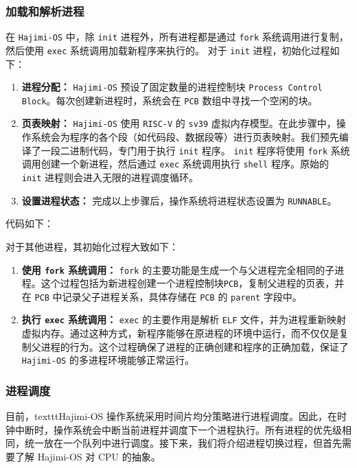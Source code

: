 \documentclass[UTF8]{article}
\begin{document}
\subsubsection{加载和解析进程}
在 \texttt{Hajimi-OS} 中，除 \texttt{init} 进程外，所有进程都是通过 \texttt{fork} 系统调用进行复制，然后使用 \texttt{exec} 系统调用加载新程序来执行的。
对于 \texttt{init} 进程，初始化过程如下：
\begin{enumerate}[label=\textbf{\arabic*}., wide, labelwidth=!, labelindent=0pt]
  \item \textbf{进程分配：} \texttt{Hajimi-OS} 预设了固定数量的进程控制块 \texttt{Process Control Block}。每次创建新进程时，系统会在 \texttt{PCB} 数组中寻找一个空闲的块。
  \item \textbf{页表映射：} \texttt{Hajimi-OS} 使用 \texttt{RISC-V} 的 \texttt{sv39} 虚拟内存模型。在此步骤中，操作系统会为程序的各个段（如代码段、数据段等）进行页表映射。我们预先编译了一段二进制代码，专门用于执行 \texttt{init} 程序。 \texttt{init} 程序将使用 \texttt{fork} 系统调用创建一个新进程，然后通过 \texttt{exec} 系统调用执行 \texttt{shell} 程序。原始的 \texttt{init} 进程则会进入无限的进程调度循环。
  \item \textbf{设置进程状态：} 完成以上步骤后，操作系统将进程状态设置为 \texttt{RUNNABLE}。
\end{enumerate}
代码如下：

对于其他进程，其初始化过程大致如下：
\begin{enumerate}[label=\textbf{\arabic*}., wide, labelwidth=!, labelindent=0pt]
  \item \textbf{使用 \texttt{fork} 系统调用：} \texttt{fork} 的主要功能是生成一个与父进程完全相同的子进程。这个过程包括为新进程创建一个进程控制块\texttt{PCB}，复制父进程的页表，并在 \texttt{PCB} 中记录父子进程关系，具体存储在 \texttt{PCB} 的 \texttt{parent} 字段中。
  \item \textbf{执行 \texttt{exec} 系统调用：} \texttt{exec} 的主要作用是解析 \texttt{ELF} 文件，并为进程重新映射虚拟内存。通过这种方式，新程序能够在原进程的环境中运行，而不仅仅是复制父进程的行为。这个过程确保了进程的正确创建和程序的正确加载，保证了 \texttt{Hajimi-OS} 的多进程环境能够正常运行。
\end{enumerate}

\subsubsection{进程调度}
目前，texttt{Hajimi-OS} 操作系统采用时间片均分策略进行进程调度。因此，在时钟中断时，操作系统会中断当前进程并调度下一个进程执行。所有进程的优先级相同，统一放在一个队列中进行调度。接下来，我们将介绍进程切换过程，但首先需要了解 Hajimi-OS 对 CPU 的抽象。
\end{document}
